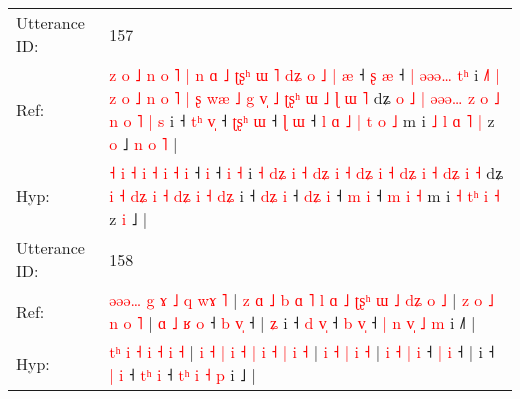 \documentclass[10pt]{article}
\DeclareRobustCommand{\hl}[1]{{\textcolor{red}{#1}}}
\begin{document}
\begin{longtable}{ll}
 \\
\midrule
Utterance ID: & 157 \\
Ref: & \hl{z}\hl{ }\hl{o}\hl{ }\hl{˩}\hl{ }\hl{n}\hl{ }\hl{o}\hl{ }\hl{˥}\hl{ }\hl{|}\hl{ }\hl{n}\hl{ }\hl{ɑ}\hl{ }\hl{˩}\hl{ }\hl{ʈ}\hl{ʂ}\hl{ʰ} \hl{ɯ} \hl{˥} \hl{d}\hl{ʑ} \hl{o} \hl{˩} \hl{|} \hl{æ} ˧\hl{ }\hl{ʂ} \hl{æ} ˧\hl{ }\hl{|} \hl{ə}\hl{ə}\hl{ə}\hl{…} \hl{t}\hl{ʰ} i\hl{ }\hl{˩}\hl{˥} \hl{|} \hl{z}\hl{ }\hl{o} \hl{˩} \hl{n} \hl{o}\hl{ }\hl{˥} \hl{|} \hl{ʂ} \hl{w}\hl{æ} \hl{˩} \hl{g} \hl{v}\hl{̩}\hl{ }\hl{˩} \hl{ʈ}\hl{ʂ}\hl{ʰ} \hl{ɯ} \hl{˩}\hl{ }\hl{ɭ} \hl{ɯ} \hl{˥} dʑ\hl{ }\hl{o} \hl{˩} \hl{|} \hl{ə}\hl{ə}\hl{ə}\hl{…} \hl{z} \hl{o} \hl{˩}\hl{ }\hl{n} \hl{o} \hl{˥} \hl{|}\hl{ }\hl{s} i ˧ \hl{t}\hl{ʰ} \hl{v}\hl{̩} ˧ \hl{ʈ}\hl{ʂ}\hl{ʰ} \hl{ɯ} ˧ \hl{ɭ} \hl{ɯ} ˧\hl{ }\hl{l}\hl{ }\hl{ɑ}\hl{ }\hl{˩}\hl{ }\hl{|} \hl{t} \hl{o} \hl{˩} m i \hl{˩} \hl{l}\hl{ }\hl{ɑ} \hl{˥} \hl{|} z \hl{o} ˩\hl{ }\hl{n}\hl{ }\hl{o}\hl{ }\hl{˥} |
 \\
Hyp: & \hl{}\hl{}\hl{}\hl{}\hl{}\hl{}\hl{}\hl{}\hl{}\hl{}\hl{}\hl{}\hl{}\hl{}\hl{}\hl{}\hl{}\hl{}\hl{}\hl{}\hl{}\hl{}\hl{˧} \hl{i} \hl{˧} \hl{}\hl{i} \hl{˧} \hl{i} \hl{˧} \hl{i} ˧\hl{}\hl{} \hl{i} ˧\hl{}\hl{} \hl{}\hl{}\hl{}\hl{i} \hl{}\hl{˧} i\hl{}\hl{}\hl{} \hl{˧} \hl{}\hl{d}\hl{ʑ} \hl{i} \hl{˧} \hl{}\hl{d}\hl{ʑ} \hl{i} \hl{˧} \hl{d}\hl{ʑ} \hl{i} \hl{˧} \hl{}\hl{}\hl{d}\hl{ʑ} \hl{}\hl{}\hl{i} \hl{˧} \hl{}\hl{d}\hl{ʑ} \hl{i} \hl{˧} dʑ\hl{}\hl{} \hl{i} \hl{˧} \hl{}\hl{}\hl{d}\hl{ʑ} \hl{i} \hl{˧} \hl{}\hl{d}\hl{ʑ} \hl{i} \hl{˧} \hl{}\hl{d}\hl{ʑ} i ˧ \hl{d}\hl{ʑ} \hl{}\hl{i} ˧ \hl{}\hl{d}\hl{ʑ} \hl{i} ˧ \hl{m} \hl{i} ˧\hl{}\hl{}\hl{}\hl{}\hl{}\hl{}\hl{}\hl{} \hl{m} \hl{i} \hl{˧} m i \hl{˧} \hl{}\hl{t}\hl{ʰ} \hl{i} \hl{˧} z \hl{i} ˩\hl{}\hl{}\hl{}\hl{}\hl{}\hl{} |
 \\
\midrule
Utterance ID: & 158 \\
Ref: & \hl{ə}\hl{ə}\hl{ə}\hl{…} \hl{g} \hl{ɤ} \hl{˩} \hl{q} \hl{w}\hl{ɤ} \hl{˥} |\hl{ }\hl{z}\hl{ }\hl{ɑ}\hl{ }\hl{˩}\hl{ }\hl{b} \hl{ɑ} \hl{˥} \hl{l} \hl{ɑ} \hl{˩} \hl{ʈ}\hl{ʂ}\hl{ʰ} \hl{ɯ} \hl{˩} \hl{d}\hl{ʑ} \hl{o} \hl{˩} |\hl{ }\hl{z} \hl{o} \hl{˩} \hl{n} \hl{o} \hl{˥} | \hl{ɑ} \hl{˩} \hl{ʁ} \hl{o} ˧ \hl{b} \hl{v}\hl{̩} ˧ |\hl{ }\hl{ʑ} i ˧ \hl{d} \hl{v}\hl{̩} ˧ \hl{b}\hl{ }\hl{v}\hl{̩} ˧ \hl{|}\hl{ }\hl{n} \hl{v}\hl{̩} \hl{˩} \hl{m} i ˩\hl{˥} |
 \\
Hyp: & \hl{}\hl{}\hl{t}\hl{ʰ} \hl{i} \hl{˧} \hl{i} \hl{˧} \hl{}\hl{i} \hl{˧} |\hl{}\hl{}\hl{}\hl{}\hl{}\hl{}\hl{}\hl{} \hl{i} \hl{˧} \hl{|} \hl{i} \hl{˧} \hl{}\hl{}\hl{|} \hl{i} \hl{˧} \hl{}\hl{|} \hl{i} \hl{˧} |\hl{}\hl{} \hl{i} \hl{˧} \hl{|} \hl{i} \hl{˧} | \hl{i} \hl{˧} \hl{|} \hl{i} ˧ \hl{|} \hl{}\hl{i} ˧ |\hl{}\hl{} i ˧ \hl{|} \hl{}\hl{i} ˧ \hl{t}\hl{ʰ}\hl{ }\hl{i} ˧ \hl{}\hl{t}\hl{ʰ} \hl{}\hl{i} \hl{˧} \hl{p} i ˩\hl{} |

\end{longtable}
\end{document}
